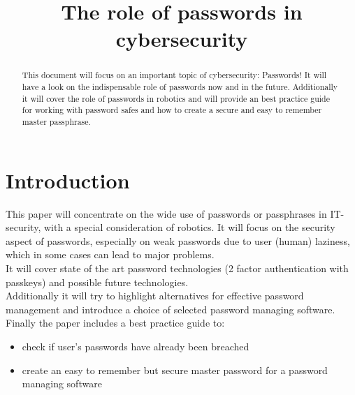 \documentclass[conference]{IEEEtran}
\begin{document}
\title{The role of passwords in cybersecurity}
\author{
\and
{}
\and
{}
\and
{}
}
\maketitle

\begin{abstract}
This document will focus on an important topic of cybersecurity: Passwords! It will have a look on the indispensable role of passwords now and in the future. Additionally it will cover the role of passwords in robotics and will provide an best practice guide for working with password safes and how to create a secure and easy to remember master passphrase.

\end{abstract}


\section{Introduction}
This paper will concentrate on the wide use of passwords or passphrases in IT-security, with a special consideration of robotics. It will focus on the security aspect of passwords, especially on weak passwords due to user (human) laziness, which in some cases can lead to major problems. \\
It will cover state of the art password technologies (2 factor authentication with passkeys) and possible future technologies.\\
Additionally it will try to highlight alternatives for effective password management and introduce a choice of selected password managing software. \\
Finally the paper includes a best practice guide to:
\begin{itemize}
\item check if user's passwords have already been breached 
\item create an easy to remember but secure master password for a password managing software
\end{itemize} 
\end{document}

